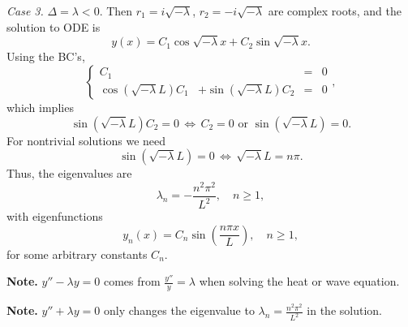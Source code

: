 \documentclass[11pt]{article}
\begin{document}
\begin{solution}
\par \textsl{Case 3.} $\Delta = \lambda <0.$ Then $r_{1}=i\sqrt{-\lambda}$, $r_{2}=-i\sqrt{-\lambda}$ are complex roots, and the solution to ODE is
\[y(x)=C_{1}\cos\sqrt{-\lambda}x+C_{2}\sin\sqrt{-\lambda}x.\]
Using the BC's,
\begin{equation*}
\left\{\begin{array}{rrcc}
       C_{1} & & = & 0\\
       \cos(\sqrt{-\lambda}L)C_{1} &+ \sin(\sqrt{-\lambda}L)C_{2}&=&0
      \end{array}\right. ,
\end{equation*}
which implies 
\[\sin(\sqrt{-\lambda}L)C_{2}=0 \,\Leftrightarrow\, C_{2} = 0 \text{ or } \sin(\sqrt{-\lambda}L)=0.\]
For nontrivial solutions we need 
\[\sin(\sqrt{-\lambda}L)=0 \,\Leftrightarrow \, \sqrt{-\lambda}L=n\pi.\] 
Thus, the eigenvalues are
\[\boxed{\lambda_{n}=-\frac{n^{2}\pi^{2}}{L^{2}}, \quad n\geq 1},\]
with eigenfunctions
\[\boxed{y_{n}(x)=C_{n}\sin\left( \frac{n\pi x}{L} \right)}, \quad n\geq 1,\]
for some arbitrary constants $C_{n}$.

\noindent \textbf{Note.} $y''-\lambda y = 0$ comes from $\frac{y''}{y}=\lambda$ when solving the heat or wave equation.

\noindent \textbf{Note.} $y'' + \lambda y = 0$ only changes the eigenvalue to $\lambda_{n}=\frac{n^{2}\pi^{2}}{L^{2}}$ in the solution.

\end{solution}
\end{document}
